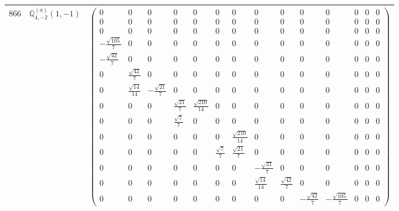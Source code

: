 \documentclass[fleqn,8pt,landscape]{jsarticle}
\begin{document}
\begin{center}
\begin{longtable}{ccc}
$ 866 $ & $ \mathbb{Q}_{4,-2}^{(a)}(1,-1) $ & $ \begin{pmatrix} 0 & 0 & 0 & 0 & 0 & 0 & 0 & 0 & 0 & 0 & 0 & 0 & 0 & 0 \\ 0 & 0 & 0 & 0 & 0 & 0 & 0 & 0 & 0 & 0 & 0 & 0 & 0 & 0 \\ 0 & 0 & 0 & 0 & 0 & 0 & 0 & 0 & 0 & 0 & 0 & 0 & 0 & 0 \\ - \frac{\sqrt{105}}{7} & 0 & 0 & 0 & 0 & 0 & 0 & 0 & 0 & 0 & 0 & 0 & 0 & 0 \\ - \frac{\sqrt{42}}{7} & 0 & 0 & 0 & 0 & 0 & 0 & 0 & 0 & 0 & 0 & 0 & 0 & 0 \\ 0 & \frac{\sqrt{42}}{7} & 0 & 0 & 0 & 0 & 0 & 0 & 0 & 0 & 0 & 0 & 0 & 0 \\ 0 & \frac{\sqrt{14}}{14} & - \frac{\sqrt{21}}{7} & 0 & 0 & 0 & 0 & 0 & 0 & 0 & 0 & 0 & 0 & 0 \\ 0 & 0 & 0 & \frac{\sqrt{21}}{7} & \frac{\sqrt{210}}{14} & 0 & 0 & 0 & 0 & 0 & 0 & 0 & 0 & 0 \\ 0 & 0 & 0 & \frac{\sqrt{7}}{7} & 0 & 0 & 0 & 0 & 0 & 0 & 0 & 0 & 0 & 0 \\ 0 & 0 & 0 & 0 & 0 & 0 & \frac{\sqrt{210}}{14} & 0 & 0 & 0 & 0 & 0 & 0 & 0 \\ 0 & 0 & 0 & 0 & 0 & \frac{\sqrt{7}}{7} & \frac{\sqrt{21}}{7} & 0 & 0 & 0 & 0 & 0 & 0 & 0 \\ 0 & 0 & 0 & 0 & 0 & 0 & 0 & - \frac{\sqrt{21}}{7} & 0 & 0 & 0 & 0 & 0 & 0 \\ 0 & 0 & 0 & 0 & 0 & 0 & 0 & \frac{\sqrt{14}}{14} & \frac{\sqrt{42}}{7} & 0 & 0 & 0 & 0 & 0 \\ 0 & 0 & 0 & 0 & 0 & 0 & 0 & 0 & 0 & - \frac{\sqrt{42}}{7} & - \frac{\sqrt{105}}{7} & 0 & 0 & 0 \end{pmatrix} $ \\ \hline

\end{longtable}
\end{center}
\end{document}
